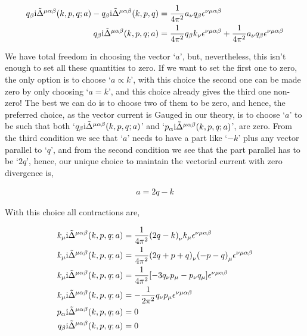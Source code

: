\begin{align}
    q_\beta\textnormal{i}{\tilde\Delta}^{\mu\alpha\beta}\qty(k,p,q;a)-q_\beta\textnormal{i}{\tilde\Delta}^{\mu\alpha\beta}\qty(k,p,q)&=
    \frac{1}{4\pi^2}a_\nu q_\beta
    \epsilon^{\nu\mu\alpha\beta}\nonumber\\
    q_\beta\textnormal{i}{\tilde\Delta}^{\mu\alpha\beta}\qty(k,p,q;a)&=\frac{1}{4\pi^2}q_\beta k_\nu\epsilon^{\nu\mu\alpha\beta}
    +\frac{1}{4\pi^2}a_\nu q_\beta
    \epsilon^{\nu\mu\alpha\beta}\nonumber
\end{align}

We have total freedom in choosing the vector `$a$', but, nevertheless, this isn't enough to set all these 
quantities to zero. If we want to set the first one to zero, the only option is to choose `$a\propto k$', 
with this choice the second one can be made zero by only choosing `$a=k$', and this choice already gives the third 
one non-zero! The best we can do is to choose two of them to be zero, and hence, the preferred choice, as the 
vector current is Gauged in our theory, is to choose `$a$' to be such that both `$q_\beta\textnormal{i}{\tilde\Delta}^{\mu\alpha\beta}\qty(k,p,q;a)$' 
and `$p_\alpha\textnormal{i}{\tilde\Delta}^{\mu\alpha\beta}\qty(k,p,q;a)$', are zero. From the third condition we see that 
`$a$' needs to have a part like `$-k$' plus any vector parallel to `$q$', and from the second condition we see 
that the part parallel has to be `$2q$', hence, our unique choice to maintain the vectorial current with zero 
divergence is,

\begin{align}
    a=2q-k\nonumber
\end{align}

With this choice all contractions are,

\begin{align}
    k_\mu\textnormal{i}{\tilde\Delta}^{\mu\alpha\beta}\qty(k,p,q;a)&=
    \frac{1}{4\pi^2}\qty(2q-k)_\nu k_\mu
    \epsilon^{\nu\mu\alpha\beta}\nonumber\\
    k_\mu\textnormal{i}{\tilde\Delta}^{\mu\alpha\beta}\qty(k,p,q;a)&=
    \frac{1}{4\pi^2}\qty(2q+p+q)_\nu \qty(-p-q)_\mu
    \epsilon^{\nu\mu\alpha\beta}\nonumber\\
    k_\mu\textnormal{i}{\tilde\Delta}^{\mu\alpha\beta}\qty(k,p,q;a)&=
    \frac{1}{4\pi^2}\qty[-3q_\nu p_\mu-p_\nu q_\mu]
    \epsilon^{\nu\mu\alpha\beta}\nonumber\\
    k_\mu\textnormal{i}{\tilde\Delta}^{\mu\alpha\beta}\qty(k,p,q;a)&=
    -\frac{1}{2\pi^2}q_\nu p_\mu
    \epsilon^{\nu\mu\alpha\beta}\nonumber\\
    p_\alpha\textnormal{i}{\tilde\Delta}^{\mu\alpha\beta}\qty(k,p,q;a)&=0\nonumber\\
    q_\beta\textnormal{i}{\tilde\Delta}^{\mu\alpha\beta}\qty(k,p,q;a)&=0\nonumber
\end{align}

